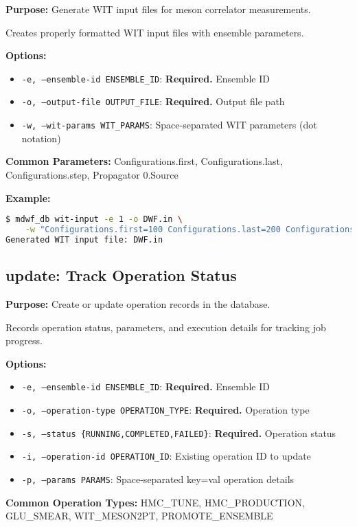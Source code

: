 \documentclass{article}
\begin{document}
\textbf{Purpose:} Generate WIT input files for meson correlator measurements.

Creates properly formatted WIT input files with ensemble parameters.

\textbf{Options:}
\begin{itemize}
\item \texttt{-e, --ensemble-id ENSEMBLE\_ID}: \textbf{Required.} Ensemble ID
\item \texttt{-o, --output-file OUTPUT\_FILE}: \textbf{Required.} Output file path
\item \texttt{-w, --wit-params WIT\_PARAMS}: Space-separated WIT parameters (dot notation)
\end{itemize}

\textbf{Common Parameters:}
Configurations.first, Configurations.last, Configurations.step, Propagator 0.Source

\textbf{Example:}
\begin{lstlisting}[language=bash]
$ mdwf_db wit-input -e 1 -o DWF.in \
    -w "Configurations.first=100 Configurations.last=200 Configurations.step=2"
Generated WIT input file: DWF.in
\end{lstlisting}

\subsection{update: Track Operation Status}

\textbf{Purpose:} Create or update operation records in the database.

Records operation status, parameters, and execution details for tracking job progress.

\textbf{Options:}
\begin{itemize}
\item \texttt{-e, --ensemble-id ENSEMBLE\_ID}: \textbf{Required.} Ensemble ID
\item \texttt{-o, --operation-type OPERATION\_TYPE}: \textbf{Required.} Operation type
\item \texttt{-s, --status \{RUNNING,COMPLETED,FAILED\}}: \textbf{Required.} Operation status
\item \texttt{-i, --operation-id OPERATION\_ID}: Existing operation ID to update
\item \texttt{-p, --params PARAMS}: Space-separated key=val operation details
\end{itemize}

\textbf{Common Operation Types:}
HMC\_TUNE, HMC\_PRODUCTION, GLU\_SMEAR, WIT\_MESON2PT, PROMOTE\_ENSEMBLE
\end{document}
